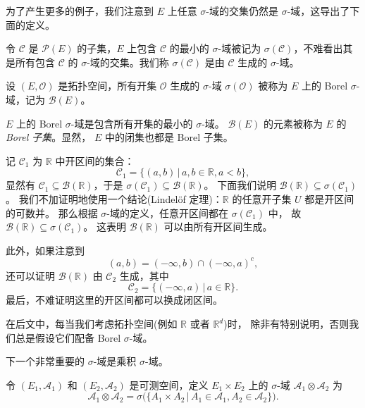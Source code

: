 \documentclass[fontset=none]{Notes}
\begin{document}
为了产生更多的例子，我们注意到 $E$ 上任意 $\sigma$-域的交集仍然是
$\sigma$-域，这导出了下面的定义。

\begin{definition}
  令 $\mathcal{C}$ 是 $\mathcal{P}(E)$ 的子集，$E$ 上包含 $\mathcal{C}$
  的最小的 $\sigma$-域被记为 $\sigma(\mathcal{C})$，不难看出其是所有包含 $\mathcal{C}$
  的 $\sigma$-域的交集。我们称 $\sigma(\mathcal{C})$ 是由 $\mathcal{C}$ 生成的
  $\sigma$-域。
\end{definition}

\begin{definition}
  设 $(E,\mathcal{O})$ 是拓扑空间，所有开集 $\mathcal{O}$ 生成的 $\sigma$-域
  $\sigma(\mathcal{O})$ 被称为 $E$ 上的 Borel $\sigma$-域，记为 $\mathcal{B}(E)$。
\end{definition}

$E$ 上的 Borel $\sigma$-域是包含所有开集的最小的 $\sigma$-域。
$\mathcal{B}(E)$ 的元素被称为 $E$ 的\emph{Borel 子集}。显然，
$E$ 中的闭集也都是 Borel 子集。

\begin{example}
  记 $\mathcal{C}_1$ 为 $\mathbb{R}$ 中开区间的集合：
  \[
    \mathcal{C}_1=\{(a,b)\,|\, a,b\in \mathbb{R},a<b\}  ,
  \]
  显然有 $\mathcal{C}_1\subseteq \mathcal{B}(\mathbb{R})$，于是
  $\sigma(\mathcal{C}_1)\subseteq \mathcal{B}(\mathbb{R})$。
  下面我们说明 $\mathcal{B}(\mathbb{R})\subseteq \sigma(\mathcal{C}_1)$。
  我们不加证明地使用一个结论(Lindel\"of 定理)：$\mathbb{R}$ 的任意开子集 $U$ 都是开区间的可数并。
  那么根据 $\sigma$-域的定义，任意开区间都在 $\sigma(\mathcal{C}_1)$ 中，
  故 $\mathcal{B}(\mathbb{R})\subseteq \sigma(\mathcal{C}_1)$。
  这表明 $\mathcal{B}(\mathbb{R})$ 可以由所有开区间生成。

  此外，如果注意到
  \[
    (a,b)=(-\infty,b)\cap (-\infty,a)^c,  
  \]
  还可以证明 $\mathcal{B}(\mathbb{R})$ 由 $\mathcal{C}_2$ 生成，其中
  \[
    \mathcal{C}_2=\{(-\infty,a)\,|\, a\in \mathbb{R}\}.
  \]
  最后，不难证明这里的开区间都可以换成闭区间。
\end{example}

在后文中，每当我们考虑拓扑空间(例如 $\mathbb{R}$ 或者 $\mathbb{R}^d$)时，
除非有特别说明，否则我们总是假设它们配备 Borel $\sigma$-域。

下一个非常重要的 $\sigma$-域是乘积 $\sigma$-域。

\begin{definition}
  令 $(E_1,\mathcal{A}_1)$ 和 $(E_2,\mathcal{A}_2)$ 是可测空间，定义
  $E_1\times E_2$ 上的 $\sigma$-域 $\mathcal{A}_1\otimes \mathcal{A}_2$ 为
  \[
    \mathcal{A}_1\otimes \mathcal{A}_2=\sigma\bigl(\{A_1\times A_2\,|\, A_1\in \mathcal{A}_1,A_2\in \mathcal{A}_2\}\bigr).
  \]
\end{definition}
\end{document}
